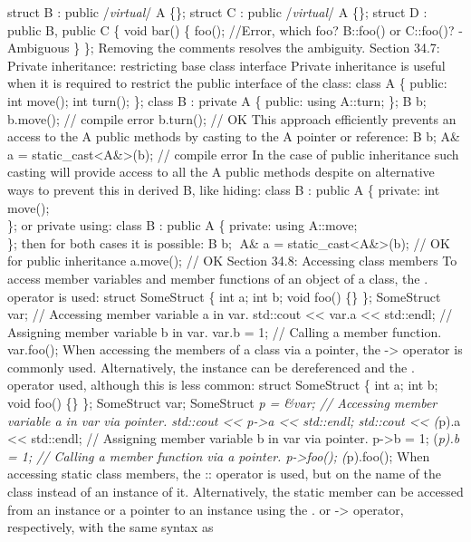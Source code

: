 struct B : public /\emph{virtual}/ A \{\}; struct C : public
/\emph{virtual}/ A \{\}; struct D : public B, public C \{ void bar() \{
foo(); //Error, which foo? B::foo() or C::foo()? - Ambiguous \} \};
Removing the comments resolves the ambiguity. Section 34.7: Private
inheritance: restricting base class interface Private inheritance is
useful when it is required to restrict the public interface of the
class: class A \{ public: int move(); int turn(); \}; class B : private
A \{ public: using A::turn; \}; B b; b.move(); // compile error
b.turn(); // OK This approach eﬃciently prevents an access to the A
public methods by casting to the A pointer or reference: B b; A\& a =
static\_cast\textless A\&\textgreater(b); // compile error In the case
of public inheritance such casting will provide access to all the A
public methods despite on alternative ways to prevent this in derived B,
like hiding: class B : public A \{ private: int move();\\
\}; or private using: class B : public A \{ private: using A::move;\\
\}; then for both cases it is possible: B b; A\& a =
static\_cast\textless A\&\textgreater(b); // OK for public inheritance
a.move(); // OK Section 34.8: Accessing class members To access member
variables and member functions of an object of a class, the . operator
is used: struct SomeStruct \{ int a; int b; void foo() \{\} \};
SomeStruct var; // Accessing member variable a in var. std::cout
\textless\textless{} var.a \textless\textless{} std::endl; // Assigning
member variable b in var. var.b = 1; // Calling a member function.
var.foo(); When accessing the members of a class via a pointer, the
-\textgreater{} operator is commonly used. Alternatively, the instance
can be dereferenced and the . operator used, although this is less
common: struct SomeStruct \{ int a; int b; void foo() \{\} \};
SomeStruct var; SomeStruct \emph{p = \&var; // Accessing member variable
a in var via pointer. std::cout \textless\textless{} p-\textgreater a
\textless\textless{} std::endl; std::cout \textless\textless{} (}p).a
\textless\textless{} std::endl; // Assigning member variable b in var
via pointer. p-\textgreater b = 1; (\emph{p).b = 1; // Calling a member
function via a pointer. p-\textgreater foo(); (}p).foo(); When accessing
static class members, the :: operator is used, but on the name of the
class instead of an instance of it. Alternatively, the static member can
be accessed from an instance or a pointer to an instance using the . or
-\textgreater{} operator, respectively, with the same syntax as
